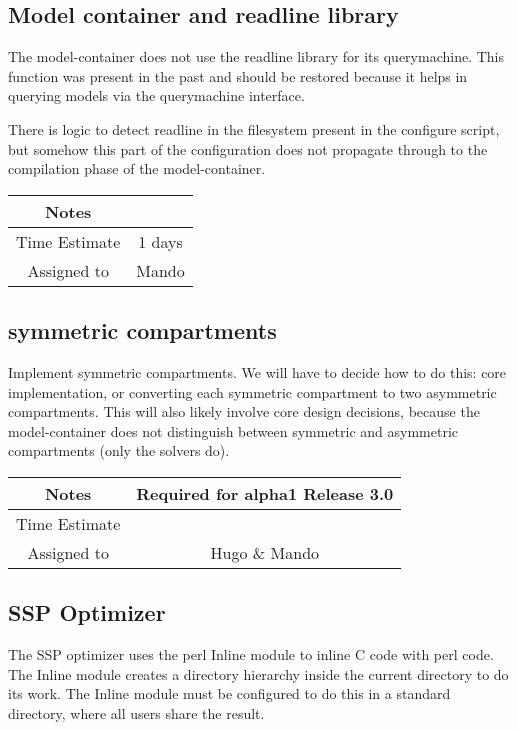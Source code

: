 \documentclass[12pt]{article}
\begin{document}
\subsection{Model container and readline library}

The model-container does not use the readline library for its
querymachine.  This function was present in the past and should be
restored because it helps in querying models via the querymachine
interface.

There is logic to detect readline in the filesystem present in the
configure script, but somehow this part of the configuration does not
propagate through to the compilation phase of the model-container.

{
  \vspace{5mm}
  \centering
  \begin{tabular}{|c|c|}
    \hline
    Notes
    & \\
    \hline
    Time Estimate
    & 1 days \\
    \hline
    Assigned to
    & Mando \\
    \hline
  \end{tabular}
}


\subsection{symmetric compartments}

Implement symmetric compartments.  We will have to decide how to do
this: core implementation, or converting each symmetric compartment to
two asymmetric compartments.  This will also likely involve core
design decisions, because the model-container does not distinguish
between symmetric and asymmetric compartments (only the solvers do).

{
  \vspace{5mm}
  \centering
  \begin{tabular}{|c|c|}
    \hline
    Notes
    & Required for alpha1 Release 3.0 \\
    \hline
    Time Estimate
    & \\
    \hline
    Assigned to
    & Hugo \& Mando \\
    \hline
  \end{tabular}
}


\subsection{SSP Optimizer}

The SSP optimizer uses the perl Inline module to inline C code with
perl code.  The Inline module creates a directory hierarchy inside the
current directory to do its work.  The Inline module must be
configured to do this in a standard directory, where all users share
the result.
\end{document}
